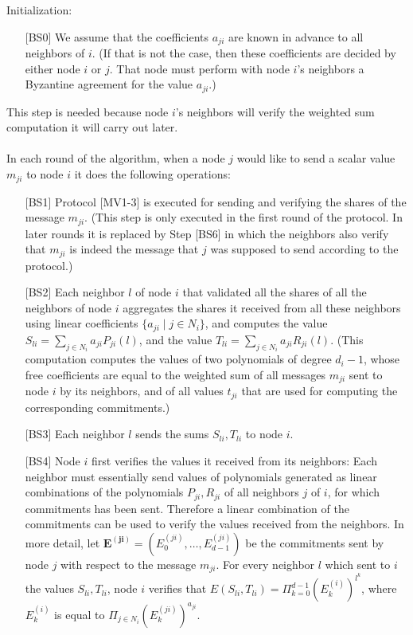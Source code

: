 \documentclass[10pt]{svjour3}
\begin{document}
Initialization:
\begin{itemize}
\item [{[BS0]}] We assume that the coefficients $a_{ji}$ are known in
  advance to all neighbors of $i$. (If that is not the case, then
  these coefficients are decided by either node $i$ or $j$. That node
  must perform with node $i$'s neighbors a Byzantine agreement for the
  value $a_{ji}$.)
\end{itemize}
This step is needed because node $i$'s neighbors will verify the weighted
sum computation it will carry out later.\\
\\
In each round of the algorithm, when a node $j$ would like to send
a scalar value $m_{ji}$ to node $i$ it does the following operations:
\begin{itemize}
\item [{[BS1]}] Protocol [MV1-3] is executed for sending and verifying
  the shares of the message $m_{ji}$. (This step is only executed in
  the first round of the protocol. In later rounds it is replaced by
  Step [BS6] in which the neighbors also verify that  $m_{ji}$ is
  indeed the message that $j$ was supposed to send according to the
  protocol.)

\item [{[BS2]}] Each neighbor $l$ of node $i$ that validated all the
  shares of all the neighbors of node $i$ aggregates the shares it
  received from all these neighbors using linear coefficients $\{
  a_{ji}\; | \; j\in N_i\}$, and computes the value $S_{li} = \sum_{j
    \in N_i} a_{ji} P_{ji}(l)$, and the value $T_{li} = \sum_{j \in
    N_i} a_{ji} R_{ji}(l)$.  (This computation computes the values of
  two polynomials of degree $d_i-1$, whose free coefficients are equal
  to the weighted sum of all messages $m_{ji}$ sent to node $i$
  by its neighbors, and of all values $t_{ji}$ that are used for
  computing the corresponding commitments.)

\item [{[BS3]}] Each neighbor $l$ sends the sums $S_{li}, T_{li}$
      to node $i$.

\item [{[BS4]}] Node $i$ first verifies the values it received
      from its neighbors: Each neighbor must
      essentially send values of polynomials generated as linear
      combinations of the polynomials $P_{ji},R_{ji}$ of all neighbors
      $j$ of $i$, for which
      commitments has been sent. Therefore a linear combination of the
      commitments can be used to verify the values received from the
      neighbors.  In more detail, let $\mathbf{E^{(ji)}}=
      (E_0^{(ji)},\ldots,E_{d-1}^{(ji)})$ be the commitments
      sent by node $j$ with respect to the message
      $m_{ji}$. For every neighbor $l$ which sent to $i$ the values $S_{li},
      T_{li}$, node $i$ verifies that $E(S_{li}, T_{li}) =
      \Pi_{k=0}^{d-1} (E_k^{(i)})^{l^k}$, where $E_k^{(i)}$ is equal
      to $\Pi_{j \in N_i} (E_k^{(ji)})^{a_{ji}}$.


\end{itemize}
\end{document}
